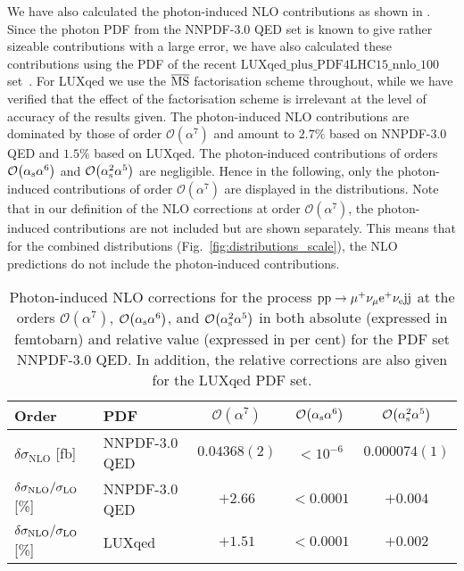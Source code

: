 \documentclass[a4article,11pt]{article}
\begin{document}
We have also calculated the photon-induced NLO contributions as shown
in . Since the photon PDF from the
NNPDF-3.0 QED set is known to give rather sizeable 
contributions with a large error,
we have also calculated these contributions using the PDF of
the recent 
$\mathrm{LUXqed}\_\mathrm{plus}\_\mathrm{PDF4LHC15}\_\mathrm{nnlo}\_100$
set~\cite{Manohar:2016nzj}. For LUXqed we use the ${\overline{\rm MS}}$
factorisation scheme throughout, while 
we have verified that 
the effect of the factorisation
scheme is irrelevant at the level of accuracy of the results given.
The photon-induced NLO contributions are dominated by those of order
$\mathcal{O}{\left(\alpha^{7}\right)}$ and amount to $2.7\%$ based on
NNPDF-3.0 QED and $1.5\%$ based on LUXqed.  The photon-induced
contributions of orders $\mathcal{O}{\left(\alpha_\text{s}\alpha^{6}\right)}$
and $\mathcal{O}{\left(\alpha_\text{s}^2\alpha^{5}\right)}$ are negligible.
Hence in the following, only the photon-induced contributions of order $\mathcal{O}{\left(\alpha^{7}\right)}$ are displayed in the distributions.
Note that in our definition of the NLO corrections at order
$\mathcal{O}{\left(\alpha^{7}\right)}$, the photon-induced
contributions are not included 
but are shown separately.
This means that for the combined distributions (Fig.~\ref{fig:distributions_scale}), the NLO predictions do not include the photon-induced contributions.
%
\begin{table}
\begin{center}
\begin{tabular}{|l|l||c|c|c|}
\hline
Order & PDF & $\mathcal{O}{\left(\alpha^{7}\right)}$ & $\mathcal{O}{\left(\alpha_\text{s}\alpha^{6}\right)}$ & $\mathcal{O}{\left(\alpha_\text{s}^{2}\alpha^{5}\right)}$ \\
\hline
\hline
${\delta \sigma_{\mathrm{NLO}}}$ [fb] & NNPDF-3.0 QED
& $0.04368(2)$ 
& $<10^{-6}$ 
& $0.000074(1)$ \\ 
\hline
$\delta \sigma_{\mathrm{NLO}}/\sigma_{\rm LO}$ [\%] & NNPDF-3.0 QED & $+2.66$ & $<0.0001$ & $+0.004$ \\
\hline
\hline
$\delta \sigma_{\mathrm{NLO}}/\sigma_{\rm LO}$ [\%] & LUXqed & $+1.51$ & $<0.0001$ & $+0.002$ \\
\hline
\end{tabular}
\end{center}
\caption{
Photon-induced NLO corrections for the process $\text{p}\text{p}\to\mu^+\nu_\mu\text{e}^+\nu_{\text{e}}\text{j}\text{j}$ at the orders 
$\mathcal{O}{\left(\alpha^{7}\right)}$, $\mathcal{O}{\left(\alpha_{\rm
      s}\alpha^{6}\right)}$, and $\mathcal{O}{\left(\alpha_{\rm
      s}^{2}\alpha^{5}\right)}$ in both absolute (expressed in femtobarn) and relative value (expressed in per cent) for the PDF set NNPDF-3.0 QED. In addition, the relative
corrections are also given for the LUXqed PDF set.}
\label{table:photoninducedXsection}
\end{table}
\end{document}
